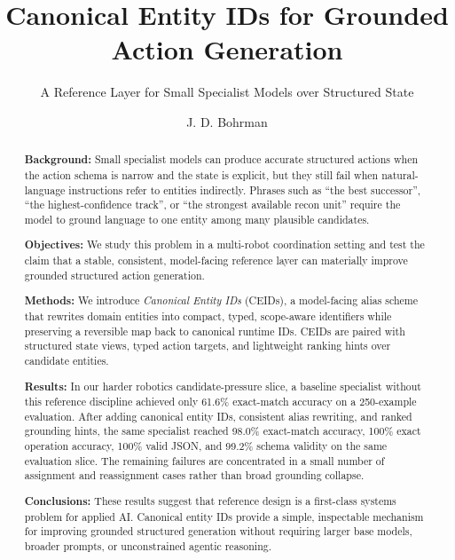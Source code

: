 \documentclass[manuscript,screen,review]{jair}
\begin{document}
\title[Canonical Entity IDs for Grounded Action Generation]{Canonical Entity IDs for Grounded Action Generation}
\subtitle{A Reference Layer for Small Specialist Models over Structured State}

\author{J. D. Bohrman}
\renewcommand{\shortauthors}{Bohrman}

\begin{abstract}
{\bf Background:}
Small specialist models can produce accurate structured actions when the action schema is narrow and the state is explicit, but they still fail when natural-language instructions refer to entities indirectly. Phrases such as \enquote{the best successor}, \enquote{the highest-confidence track}, or \enquote{the strongest available recon unit} require the model to ground language to one entity among many plausible candidates.

{\bf Objectives:}
We study this problem in a multi-robot coordination setting and test the claim that a stable, consistent, model-facing reference layer can materially improve grounded structured action generation.

{\bf Methods:}
We introduce \emph{Canonical Entity IDs} (CEIDs), a model-facing alias scheme that rewrites domain entities into compact, typed, scope-aware identifiers while preserving a reversible map back to canonical runtime IDs. CEIDs are paired with structured state views, typed action targets, and lightweight ranking hints over candidate entities.

{\bf Results:}
In our harder robotics candidate-pressure slice, a baseline specialist without this reference discipline achieved only 61.6\% exact-match accuracy on a 250-example evaluation. After adding canonical entity IDs, consistent alias rewriting, and ranked grounding hints, the same specialist reached 98.0\% exact-match accuracy, 100\% exact operation accuracy, 100\% valid JSON, and 99.2\% schema validity on the same evaluation slice. The remaining failures are concentrated in a small number of assignment and reassignment cases rather than broad grounding collapse.

{\bf Conclusions:}
These results suggest that reference design is a first-class systems problem for applied AI. Canonical entity IDs provide a simple, inspectable mechanism for improving grounded structured generation without requiring larger base models, broader prompts, or unconstrained agentic reasoning.
\end{abstract}
\end{document}
